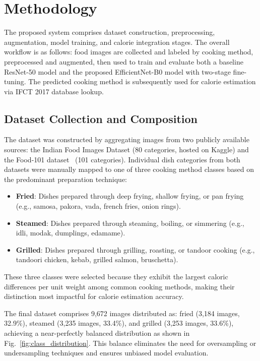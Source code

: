 \documentclass[journal]{IEEEtran}
\begin{document}
\section{Methodology}

The proposed system comprises dataset construction, preprocessing, augmentation, model training, and calorie integration stages. The overall workflow is as follows: food images are collected and labeled by cooking method, preprocessed and augmented, then used to train and evaluate both a baseline ResNet-50 model and the proposed EfficientNet-B0 model with two-stage fine-tuning. The predicted cooking method is subsequently used for calorie estimation via IFCT 2017 database lookup.

\subsection{Dataset Collection and Composition}

The dataset was constructed by aggregating images from two publicly available sources: the Indian Food Images Dataset (80 categories, hosted on Kaggle) and the Food-101 dataset~\cite{bossard2014food} (101 categories). Individual dish categories from both datasets were manually mapped to one of three cooking method classes based on the predominant preparation technique:

\begin{itemize}
    \item \textbf{Fried}: Dishes prepared through deep frying, shallow frying, or pan frying (e.g., samosa, pakora, vada, french fries, onion rings).
    \item \textbf{Steamed}: Dishes prepared through steaming, boiling, or simmering (e.g., idli, modak, dumplings, edamame).
    \item \textbf{Grilled}: Dishes prepared through grilling, roasting, or tandoor cooking (e.g., tandoori chicken, kebab, grilled salmon, bruschetta).
\end{itemize}

These three classes were selected because they exhibit the largest caloric differences per unit weight among common cooking methods, making their distinction most impactful for calorie estimation accuracy.

The final dataset comprises 9,672 images distributed as: fried (3,184 images, 32.9\%), steamed (3,235 images, 33.4\%), and grilled (3,253 images, 33.6\%), achieving a near-perfectly balanced distribution as shown in Fig.~\ref{fig:class_distribution}. This balance eliminates the need for oversampling or undersampling techniques and ensures unbiased model evaluation.
\end{document}
